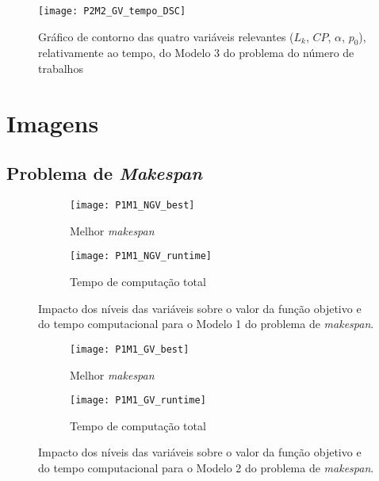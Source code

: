 \begin{figure}[H]
\caption{Gráfico de contorno das quatro variáveis relevantes ($L_{k}$, $CP$, $\alpha$, $p_{0}$), relativamente ao tempo, do Modelo 3 do problema do número de trabalhos}
\centering
\texttt{[image: P2M2\_GV\_tempo\_DSC]}
\end{figure}



\chapter{Imagens}
\label{chp:imagens}

\newpage

\section{Problema de \textit{Makespan}}

\begin{figure}[H]
	\centering
	\begin{subfigure}{0.49\textwidth}
	\centering
		\texttt{[image: P1M1\_NGV\_best]}
		\caption{Melhor \textit{makespan}}
		\label{fig:P1M1_NGV_best}
	\end{subfigure}
	\begin{subfigure}{0.49\textwidth}
	\centering
		\texttt{[image: P1M1\_NGV\_runtime]}
		\caption{Tempo de computação total}
		\label{fig:P1M1_NGV_runtime}
	\end{subfigure}
	\caption{Impacto dos níveis das variáveis sobre o valor da função objetivo e do tempo computacional para o Modelo 1 do problema de \textit{makespan}.}
	\label{fig:P1M1_NGV_alt}
\end{figure}

\begin{figure}[H]
	\centering
	\begin{subfigure}{0.49\textwidth}
	\centering
		\texttt{[image: P1M1\_GV\_best]}
		\caption{Melhor \textit{makespan}}
		\label{fig:P1M1_GV_best}
	\end{subfigure}
	\begin{subfigure}{0.49\textwidth}
	\centering
		\texttt{[image: P1M1\_GV\_runtime]}
		\caption{Tempo de computação total}
		\label{fig:P1M1_GV_runtime}
	\end{subfigure}
	\caption{Impacto dos níveis das variáveis sobre o valor da função objetivo e do tempo computacional para o Modelo 2 do problema de \textit{makespan}.}
	\label{fig:P1M1_GV_alt}
\end{figure}

